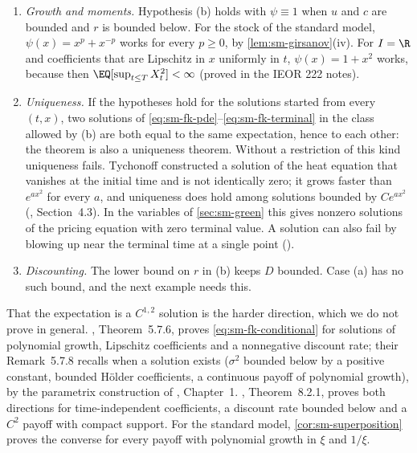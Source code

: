 \begin{remark}\label{rem:sm-fk-hypotheses}
\leavevmode
\begin{enumerate}[label=(\alph*),leftmargin=*]
  \item \emph{Growth and moments.} Hypothesis (b) holds with $\psi\equiv1$ when $u$ and $c$ are
    bounded and $r$ is bounded below. For the stock of the standard model, $\psi(x)=x^p+x^{-p}$
    works for every $p\ge0$, by \cref{lem:sm-girsanov}(iv). For $I=\R$ and coefficients that are
    Lipschitz in $x$ uniformly in $t$, $\psi(x)=1+x^2$ works, because then
    $\EQ[\sup_{t\le T}X_t^2]<\infty$ (proved in the IEOR 222 notes).
  \item \emph{Uniqueness.} If the hypotheses hold for the solutions started from every $(t,x)$,
    two solutions of \eqref{eq:sm-fk-pde}--\eqref{eq:sm-fk-terminal} in the class allowed by (b)
    are both equal to the same expectation, hence to each other: the theorem is also a uniqueness
    theorem. Without a restriction of this kind uniqueness fails. Tychonoff constructed a solution
    of the heat equation that vanishes at the initial time and is not identically zero; it grows
    faster than $e^{ax^2}$ for every $a$, and uniqueness does hold among solutions bounded by
    $Ce^{ax^2}$ (\textcite{karatzas-shreve}, Section~4.3). In the variables of
    \cref{sec:sm-green} this gives nonzero solutions of the pricing equation with zero terminal
    value. A solution can also fail by blowing up near the terminal time at a single point
    ().
  \item \emph{Discounting.} The lower bound on $r$ in (b) keeps $D$ bounded. Case (a) has no such
    bound, and the next example needs this.
\end{enumerate}
\end{remark}

\begin{remark}\label{rem:sm-fk-converse}
That the expectation is a $C^{1,2}$ solution is the harder direction, which we do not prove in
general. \textcite{karatzas-shreve}, Theorem~5.7.6, proves \eqref{eq:sm-fk-conditional} for
solutions of polynomial growth, Lipschitz coefficients and a nonnegative discount rate; their
Remark~5.7.8 recalls when a
solution exists ($\sigma^2$ bounded below by a positive constant, bounded H\"older coefficients,
a continuous payoff of polynomial growth), by the parametrix construction of
\textcite{friedman-parabolic}, Chapter~1. \textcite{oksendal}, Theorem~8.2.1, proves both
directions for time-independent coefficients, a discount rate bounded below and a $C^2$ payoff
with compact support. For the standard model, \cref{cor:sm-superposition} proves the converse
for every payoff with polynomial growth in $\xi$ and $1/\xi$.
\end{remark}

